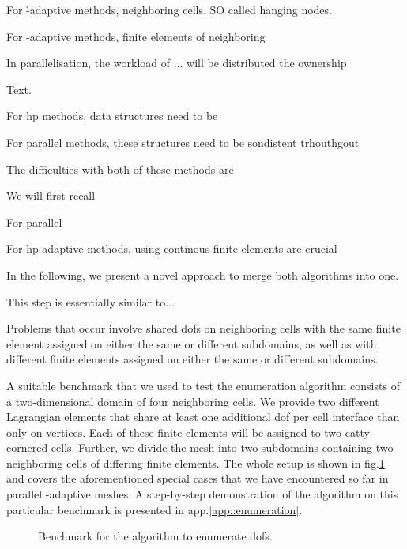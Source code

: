 For \h-adaptive methods, neighboring cells. SO called hanging nodes.

For \p-adaptive methods, finite elements of neighboring 

In parallelisation, the workload of ... will be distributed the ownership




Text.


For hp methods, data structures need to be 

For parallel methods, these structures need to be sondistent trhouthgout

The difficulties with both of these methods are

We will first recall

For parallel


For hp adaptive methods, using continous finite elements are crucial

In the following, we present a novel approach to merge both algorithms into one.



This step is essentially similar to...


Problems that occur involve shared \glspl{dof} on neighboring cells with the same finite element assigned on either the same or different subdomains, as well as with different finite elements assigned on either the same or different subdomains.

A suitable benchmark that we used to test the enumeration algorithm consists of a two-dimensional domain of four neighboring cells. We provide two different Lagrangian elements that share at least one additional \gls{dof} per cell interface than only on vertices. Each of these finite elements will be assigned to two catty-cornered cells. Further, we divide the mesh into two subdomains containing two neighboring cells of differing finite elements. The whole setup is shown in fig.\@ \ref{fig:enumbenchmark} and covers the aforementioned special cases that we have encountered so far in parallel \hp-adaptive meshes. A step-by-step demonstration of the algorithm on this particular benchmark is presented in app.\@ \ref{app::enumeration}.

\begin{figure}
  \centering
  \caption{Benchmark for the algorithm to enumerate \glspl{dof}.}
  \label{fig:enumbenchmark}
\end{figure}

